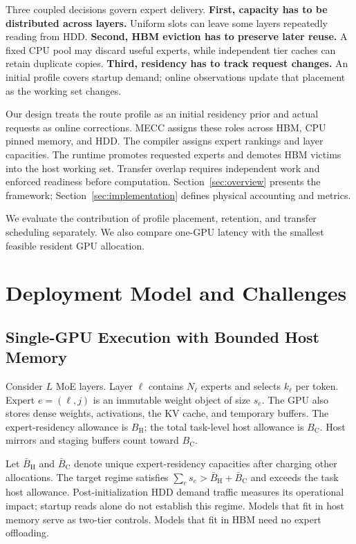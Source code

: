 \documentclass[conference,9pt,letterpaper]{IEEEtran}
\newcommand{\mecc}{\textsc{MECC}}
\newcommand{\BH}{B_{\mathrm H}}
\newcommand{\BC}{B_{\mathrm C}}
\begin{document}
Three coupled decisions govern expert delivery. \textbf{First, capacity has to be distributed across layers.} Uniform slots can leave some layers repeatedly reading from HDD. \textbf{Second, HBM eviction has to preserve later reuse.} A fixed CPU pool may discard useful experts, while independent tier caches can retain duplicate copies. \textbf{Third, residency has to track request changes.} An initial profile covers startup demand; online observations update that placement as the working set changes.

Our design treats the route profile as an initial residency prior and actual requests as online corrections. \mecc{} assigns these roles across HBM, CPU pinned memory, and HDD. The compiler assigns expert rankings and layer capacities. The runtime promotes requested experts and demotes HBM victims into the host working set. Transfer overlap requires independent work and enforced readiness before computation. Section~\ref{sec:overview} presents the framework; Section~\ref{sec:implementation} defines physical accounting and metrics.

We evaluate the contribution of profile placement, retention, and transfer scheduling separately. We also compare one-GPU latency with the smallest feasible resident GPU allocation.

\section{Deployment Model and Challenges}
\label{sec:challenges}
\subsection{Single-GPU Execution with Bounded Host Memory}
Consider $L$ MoE layers. Layer $\ell$ contains $N_\ell$ experts and selects $k_\ell$ per token. Expert $e=(\ell,j)$ is an immutable weight object of size $s_e$. The GPU also stores dense weights, activations, the KV cache, and temporary buffers. The expert-residency allowance is $\BH$; the total task-level host allowance is $\BC$. Host mirrors and staging buffers count toward $\BC$.

Let $\bar B_{\mathrm H}$ and $\bar B_{\mathrm C}$ denote unique expert-residency capacities after charging other allocations. The target regime satisfies $\sum_e s_e>\bar B_{\mathrm H}+\bar B_{\mathrm C}$ and exceeds the task host allowance. Post-initialization HDD demand traffic measures its operational impact; startup reads alone do not establish this regime. Models that fit in host memory serve as two-tier controls. Models that fit in HBM need no expert offloading.
\end{document}
